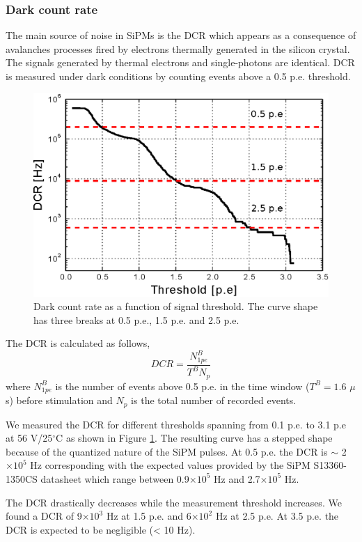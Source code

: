 \documentclass[a4paper,11pt]{article}
\begin{document}
\subsubsection{Dark count rate}
The main source of noise in SiPMs is the DCR which appears as a consequence of avalanches processes fired by electrons thermally generated in the silicon crystal. The signals generated by thermal electrons and single-photons are identical. DCR is measured under dark conditions by counting events above a 0.5 p.e. threshold.

\begin{figure}[htbp]
\centering %
\includegraphics[width=.55\textwidth]{Figures/DCR_vs_th_pe_1350CS.eps}
\caption{\label{fig:DCR} Dark count rate as a function of signal threshold. The curve shape has three breaks at 0.5 p.e., 1.5 p.e. and 2.5 p.e.}
\end{figure}

The DCR is calculated as follows,
\begin{equation}
    DCR = \frac{N_{1pe}^B}{T^B N_p}
    \label{DCR_eq}
\end{equation}
where $N_{1pe}^B$ is the number of events above 0.5 p.e. in the time window ($T^B=1.6$ $\mu$s) before stimulation and $N_p$ is the total number of recorded events.

We measured the DCR for different thresholds spanning from 0.1 p.e. to 3.1 p.e at 56 V/25$^{\circ}$C as shown in Figure \ref{fig:DCR}. The resulting curve has a stepped shape because of the quantized nature of the SiPM pulses. At 0.5 p.e. the DCR is $\sim$ 2$\times 10^5$ Hz corresponding with the expected values provided by the SiPM S13360-1350CS datasheet which range between 0.9$\times 10^5$ Hz and 2.7$\times 10^5$ Hz.

The DCR drastically decreases while the measurement threshold increases. We found a DCR of 9$\times 10^3$ Hz at 1.5 p.e. and 6$\times 10^2$ Hz at 2.5 p.e. At 3.5 p.e. the DCR is expected to be negligible (< 10 Hz).
\end{document}

